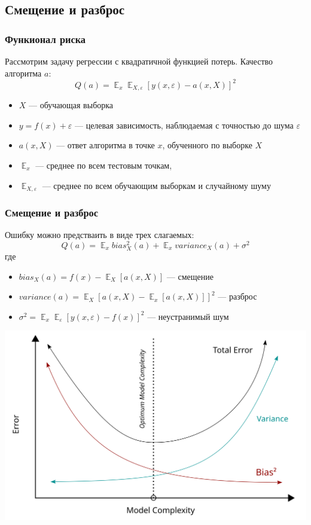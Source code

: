 \documentclass{beamer}
\newcommand{\eps}{\varepsilon}
\DeclareMathOperator{\E}{\mathbb{E}}
\begin{document}
	\subsection{Смещение и разброс}

	\begin{frame}
		\frametitle{Функионал риска}
		Рассмотрим задачу регрессии с квадратичной функцией потерь. Качество алгоритма $a$:
		\[
		Q(a) = \E_x \E_{X, \eps} [y(x, \eps) - a(x, X)]^{2}
		\]

		\begin{itemize}
			\item $X$ --- обучающая выборка
			\item $y = f(x) + \eps$ --- целевая зависимость, наблюдаемая с точностью до шума $\eps$
			\item $a(x, X)$ --- ответ алгоритма в точке $x$, обученного по выборке $X$
			\item $\E_x$ --- среднее по всем тестовым точкам, 
			\item $\E_{X, \eps}$ --- среднее по всем обучающим выборкам и случайному шуму
		\end{itemize}
	\end{frame}

	\begin{frame}
		\frametitle{Смещение и разброс}
		
		Ошибку можно предстваить в виде трех слагаемых:
		\[
		Q(a) = \E_x bias_X^2 (a) + 
		\E_x variance_X (a)
		+ \sigma^2
		\]
		где
		\begin{itemize}
			\item $bias_X(a) = f(x) - \E_X [a(x, X)]$ --- смещение
			\item $variance(a) = \E_X [ a(x, X) - \E_x[a(x, X)] ]^2$ --- разброс
			\item $\sigma^2 = \E_x \E_{\eps} [y(x, \eps) - f(x)]^2$ --- неустранимый шум
		\end{itemize}
	\end{frame}

	\begin{frame}
		\includegraphics[width=1\textwidth]{img/bias_variance_tradeoff.png}	
	\end{frame}
\end{document}
